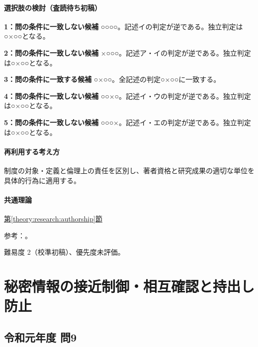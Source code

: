 \paragraph{選択肢の検討（査読待ち初稿）}\mbox{}\par

\noindent\textbf{1：問の条件に一致しない候補} ○○○○。記述イの判定が逆である。独立判定は○×○○となる。\par

\noindent\textbf{2：問の条件に一致しない候補} ×○○○。記述ア・イの判定が逆である。独立判定は○×○○となる。\par

\noindent\textbf{3：問の条件に一致する候補} ○×○○。全記述の判定○×○○に一致する。\par

\noindent\textbf{4：問の条件に一致しない候補} ○○×○。記述イ・ウの判定が逆である。独立判定は○×○○となる。\par

\noindent\textbf{5：問の条件に一致しない候補} ○○○×。記述イ・エの判定が逆である。独立判定は○×○○となる。\par

\paragraph{再利用する考え方} 制度の対象・定義と倫理上の責任を区別し、著者資格と研究成果の適切な単位を具体的行為に適用する。

\paragraph{共通理論} \hyperref[theory:research:authorship]{第\ref*{theory:research:authorship}節}

\par 参考：\cite{jsps_integrity2025}。

\par 難易度 2（校準初稿）、優先度未評価。

\section{秘密情報の接近制御・相互確認と持出し防止}

\subsection{令和元年度 問9}
\label{q:r01-reg-apt-09}

